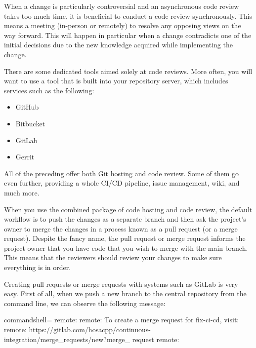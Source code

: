 When a change is particularly controversial and an asynchronous code review takes too much time, it is beneficial to conduct a code review synchronously. This means a meeting (in-person or remotely) to resolve any opposing views on the way forward. This will happen in particular when a change contradicts one of the initial decisions due to the new knowledge acquired while implementing the change.

There are some dedicated tools aimed solely at code reviews. More often, you will want to use a tool that is built into your repository server, which includes services such as the following:

\begin{itemize}
\item 
GitHub

\item 
Bitbucket

\item 
GitLab

\item 
Gerrit
\end{itemize}

All of the preceding offer both Git hosting and code review. Some of them go even further, providing a whole CI/CD pipeline, issue management, wiki, and much more.

When you use the combined package of code hosting and code review, the default workflow is to push the changes as a separate branch and then ask the project's owner to merge the changes in a process known as a pull request (or a merge request). Despite the fancy name, the pull request or merge request informs the project owner that you have code that you wish to merge with the main branch. This means that the reviewers should review your changes to make sure everything is in order.


Creating pull requests or merge requests with systems such as GitLab is very easy. First of all, when we push a new branch to the central repository from the command line, we can observe the following message:

\begin{tcblisting}{commandshell={}}
remote:
remote: To create a merge request for fix-ci-cd, visit:
remote:
https://gitlab.com/hosacpp/continuous-integration/merge_requests/new?merge_
request%
remote:	
\end{tcblisting}

